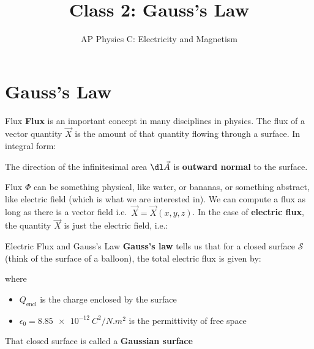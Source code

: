 \documentclass[12pt,aspectratio=169]{beamer}
\title{Class 2: Gauss's Law}
\subtitle{AP Physics C: Electricity and Magnetism}
\begin{document}
\begin{frame}
  \maketitle
\end{frame}


\section{Gauss's Law}

\begin{frame}{Flux}
  \textbf{Flux} is an important concept in many disciplines in physics. The
  flux of a vector quantity $\vec X$ is the amount of that quantity flowing
  through a surface. In integral form:


  The direction of the infinitesimal area $\dl\vec A$ is \textbf{outward normal}
  to the surface.
  \begin{center}
  \end{center}
\end{frame}



\begin{frame}{Flux}
  \vspace{.2in}$\Phi$ can be something physical, like water, or bananas, or
  something abstract, like electric field (which is what we are interested
  in). We can compute a flux as long as there is a vector field i.e.\
  $\vec X=\vec X(x,y,z)$. In the case of \textbf{electric flux}, the quantity
  $\vec X$ is just the electric field, i.e.:
    
  \begin{center}
  \end{center}
\end{frame}



\begin{frame}{Electric Flux and Gauss's Law}
  \textbf{Gauss's law} tells us that for a closed surface $\mathcal S$ (think
  of the surface of a balloon), the total electric flux is given by:

    
  where
  \begin{itemize}
  \item $Q_\text{encl}$ is the charge enclosed by the surface
  \item $\epsilon_0=\SI{8.85e-12}{C^2/N.m^2}$ is the permittivity of free space
  \end{itemize}
  That closed surface is called a \textbf{Gaussian surface}
\end{frame}
\end{document}
